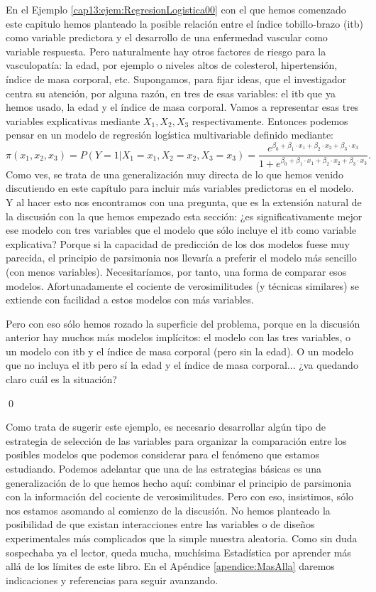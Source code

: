 \begin{ejemplo}
	\label{cap13:ejem:RegresionLogisticaMultivariableSeleccionModelos}
	En el Ejemplo \ref{cap13:ejem:RegresionLogistica00} con el que hemos comenzado este capitulo hemos planteado la posible relación entre el índice tobillo-brazo (itb) como variable predictora y el desarrollo de una enfermedad vascular como variable respuesta. Pero naturalmente hay otros factores de riesgo para la vasculopatía: la edad, por ejemplo o  niveles altos de colesterol, hipertensión, índice de masa corporal, etc. Supongamos, para fijar ideas, que el investigador centra su atención, por alguna razón, en tres de esas variables: el itb que ya hemos usado, la edad y el índice de masa corporal. Vamos a representar esas tres variables explicativas mediante $X_1, X_2, X_3$ respectivamente. Entonces podemos pensar en un modelo de regresión logística multivariable definido mediante:
\[
{\pi}(x_1, x_2, x_3) = P(Y=1|X_1=x_1, X_2 = x_2, X_3=x_3)= 
\dfrac{
	e^{\beta_0+\beta_1\cdot x_1+\beta_2\cdot x_2+\beta_3\cdot x_3}
	}{
	1 + e^{\beta_0+\beta_1\cdot x_1+\beta_2\cdot x_2+\beta_3\cdot x_3}
	}.
\]
Como ves, se trata de una generalización muy directa de lo que hemos venido discutiendo en este capítulo para incluir más variables predictoras en el modelo. Y al hacer esto nos encontramos con una pregunta, que es la extensión natural de la discusión con la que hemos empezado esta sección: ¿es significativamente mejor ese modelo con tres variables que el modelo que sólo incluye el itb como variable explicativa? Porque si la capacidad de predicción de los dos modelos fuese muy parecida, el principio de parsimonia nos llevaría a preferir el modelo más sencillo (con menos variables). Necesitaríamos, por tanto, una forma de comparar esos modelos. Afortunadamente el cociente de verosimilitudes (y técnicas similares) se extiende con facilidad a estos modelos con más variables.

Pero con eso sólo hemos rozado la superficie del problema, porque en la discusión anterior hay muchos más modelos implícitos: el modelo con las tres variables, o un modelo con itb y el índice de masa corporal (pero sin la edad). O un modelo
que no incluya el itb pero sí la edad y el índice de masa corporal... ¿va quedando claro cuál es la situación?

\qed	
\end{ejemplo}
Como trata de sugerir este ejemplo, es necesario desarrollar algún tipo de estrategia de selección de las variables para organizar la comparación entre los posibles modelos que podemos considerar para el fenómeno que estamos estudiando. Podemos adelantar que una de las estrategias básicas es una generalización de lo que hemos hecho aquí: combinar el principio de parsimonia con la información del cociente de verosimilitudes.  Pero con eso, insistimos, sólo nos estamos asomando al comienzo de la discusión. No hemos planteado la posibilidad de que existan  interacciones entre las variables o de diseños experimentales más complicados que la simple muestra aleatoria. Como sin duda sospechaba ya el lector, queda mucha, muchísima Estadística por aprender más allá de los límites de este libro. En el Apéndice \ref{apendice:MasAlla} daremos indicaciones y referencias para seguir avanzando.


